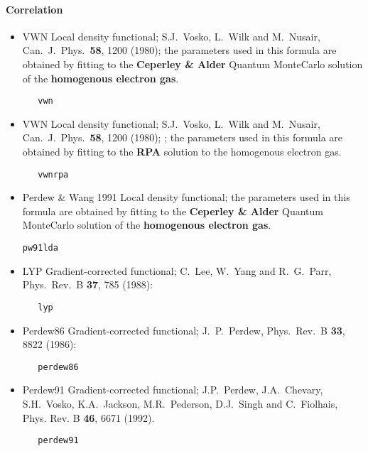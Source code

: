 \paragraph{Correlation}
\begin{itemize}
\item VWN Local density functional; S.J.~Vosko, L.~Wilk and M.~Nusair, 
  Can.~J.~Phys.~{\bf  58}, 1200 (1980); the parameters used in this
  formula are obtained by fitting to the {\bf Ceperley \&
  Alder\footnotemark[1]} Quantum
  MonteCarlo solution of the {\bf homogenous electron gas}.
\begin{verbatim}
   vwn
\end{verbatim}
\item VWN Local density functional; S.J.~Vosko, L.~Wilk and M.~Nusair, 
  Can.~J.~Phys.~{\bf  58}, 1200 (1980); ; the parameters used in this
  formula are obtained by fitting to the {\bf RPA} solution to the
  homogenous electron gas.
\begin{verbatim}
   vwnrpa
\end{verbatim}
\item Perdew \& Wang 1991 Local density functional; the parameters used in this
  formula are obtained by fitting to the {\bf Ceperley \&
  Alder\footnotemark[1]} Quantum
  MonteCarlo solution of the {\bf homogenous electron gas}.
\begin{verbatim}
pw91lda
\end{verbatim}
\item LYP Gradient-corrected functional; 
  C.~Lee, W.~Yang and R.~G.~Parr, Phys.~Rev.~B {\bf 37}, 785 (1988):
\begin{verbatim}
   lyp
\end{verbatim}
\item Perdew86 Gradient-corrected functional; J.~P.~Perdew, Phys.~Rev.~B 
  {\bf33}, 8822 (1986):
\begin{verbatim}
   perdew86
\end{verbatim}
\item Perdew91 Gradient-corrected functional;  J.P.~Perdew,
  J.A.~Chevary, S.H.~Vosko, K.A.~Jackson, M.R.~Pederson, D.J.~Singh and C.~Fiolhais,
Phys. Rev. B {\bf 46}, 6671 (1992).

\begin{verbatim}
   perdew91
\end{verbatim}
\end{itemize}

